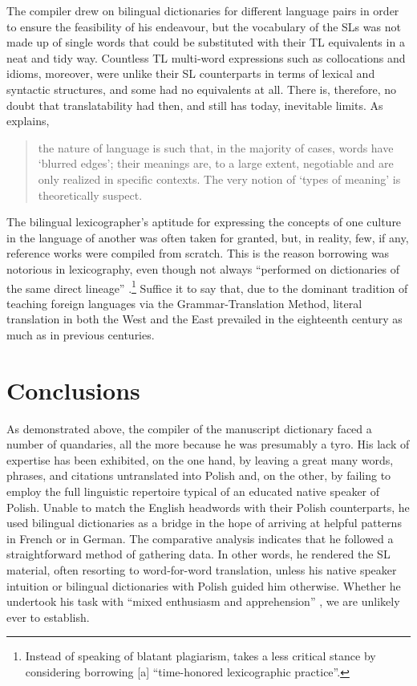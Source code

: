 \documentclass[output=paper,colorlinks,citecolor=brown,arabicfont,chinesefont]{langscibook}
\begin{document}
The compiler drew on bilingual dictionaries for different language pairs in order to ensure the feasibility of his endeavour, but the vocabulary of the SLs was not made up of single words that could be substituted with their TL equivalents in a neat and tidy way. Countless TL multi-word expressions such as collocations and idioms, moreover, were unlike their SL counterparts in terms of lexical and syntactic structures, and some had no equivalents at all. There is, therefore, no doubt that translatability had then, and still has today, inevitable limits. As \citet[17]{Baker_mona1992} explains,

\begin{quote}
    the nature of language is such that, in the majority of cases, words have ‘blurred edges’; their meanings are, to a large extent, negotiable and are only realized in specific contexts. The very notion of ‘types of meaning’ is theoretically suspect.
\end{quote}

The bilingual lexicographer’s aptitude for expressing the concepts of one culture in the language of another was often taken for granted, but, in reality, few, if any, reference works were compiled from scratch. This is the reason borrowing was notorious in lexicography, even though not always “performed on dictionaries of the same direct lineage” \citep[137]{Francoeur_aline2010}.\footnote{Instead of speaking of blatant plagiarism, \citet[97]{Dolezal_fredric_t2023} takes a less critical stance by considering borrowing [a] “time-honored lexicographic practice”.} Suffice it to say that, due to the dominant tradition of teaching foreign languages via the Grammar-Translation Method, literal translation in both the West and the East prevailed in the eighteenth century as much as in previous centuries.

\section{Conclusions}

As demonstrated above, the compiler of the manuscript dictionary faced a number of quandaries, all the more because he was presumably a tyro. His lack of expertise has been exhibited, on the one hand, by leaving a great many words, phrases, and citations untranslated into Polish and, on the other, by failing to employ the full linguistic repertoire typical of an educated native speaker of Polish. Unable to match the English headwords with their Polish counterparts, he used bilingual dictionaries as a bridge in the hope of arriving at helpful patterns in French or in German. The comparative analysis indicates that he followed a straightforward method of gathering data. In other words, he rendered the SL material, often resorting to word-for-word translation, unless his native speaker intuition or bilingual dictionaries with Polish guided him otherwise. Whether he undertook his task with “mixed enthusiasm and apprehension” \citep[133]{Cormier_monique2010}, we are unlikely ever to establish.
\end{document}

